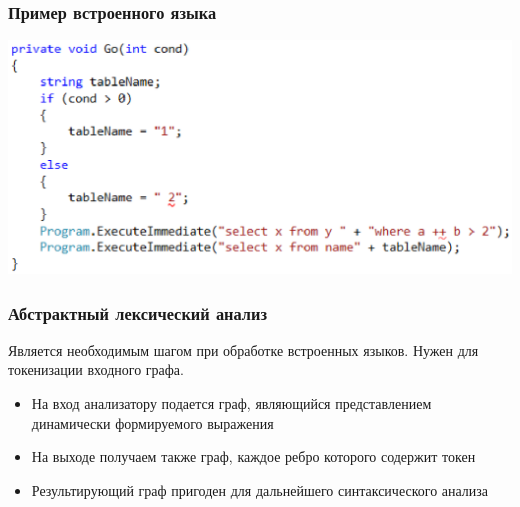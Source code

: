 \documentclass{beamer}
\begin{document}
\begin{frame}
	\transwipe[direction=90]
	\frametitle{Пример встроенного языка}
    \begin{center}
         {\includegraphics[width=0.89\linewidth]{WithReSharper}}
    \end{center}
\end{frame}

\begin{frame}[fragile]
	\transwipe[direction=90]
	\frametitle{Абстрактный лексический анализ}
	Является необходимым шагом при обработке встроенных языков. Нужен для токенизации входного графа.
	\begin{itemize}
		\item На вход анализатору подается граф, являющийся представлением динамически формируемого выражения
		\item На выходе получаем также граф, каждое ребро которого содержит токен
		\item Результирующий граф пригоден для дальнейшего синтаксического анализа
	\end{itemize}
\end{frame}
\end{document}

